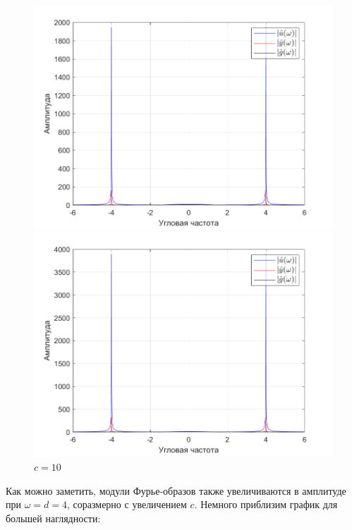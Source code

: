 \documentclass[a4paper]{article}
\begin{document}
\begin{figure}[H]
    \begin{minipage}{0.5\textwidth}
        \centering
        \includegraphics[width=\linewidth]{ex1_2/a1=0_a2=25_b1=10.5_b2=25_d=4_c=5/h4.png}
        \caption{$c=5$}
    \end{minipage}
    \begin{minipage}{0.5\textwidth}
        \centering
        \includegraphics[width=\linewidth]{ex1_2/a1=0_a2=25_b1=10.5_b2=25_d=4_c=10/h4.png}
        \caption{$c=10$}
    \end{minipage}
\end{figure}

Как можно заметить, модули Фурье-образов также увеличиваются в амплитуде при $\omega = d = 4$, соразмерно с увеличением $c$. Немного приблизим график для большей наглядности:
\end{document}
